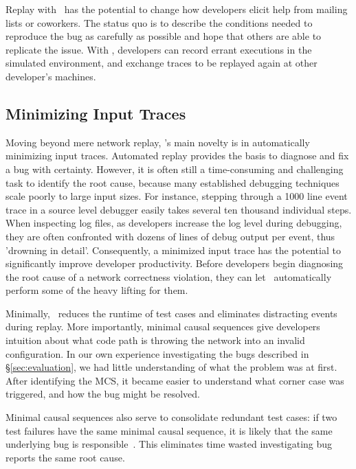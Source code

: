 Replay with \projectname~has the potential to change how developers elicit help from
mailing lists or coworkers. The status quo is to describe the conditions needed to
reproduce the bug as carefully as possible and hope that others are able
to replicate the issue. With \projectname, developers can record errant executions in the simulated
environment, and exchange traces to be replayed again at other
developer's machines.

\subsection{Minimizing Input Traces}

Moving beyond mere network replay, \projectname's main novelty is in
automatically minimizing input traces. Automated replay provides the basis to
diagnose and fix a bug with certainty. However, it is often still a
time-consuming and challenging task to identify the root cause, because many
established debugging techniques scale poorly to large input sizes. For
instance, stepping through a 1000 line event trace in a source level debugger
easily takes several ten thousand individual steps. When inspecting log files,
as developers increase the log level during debugging, they are often confronted
with dozens of lines of debug output per event, thus 'drowning in detail'.
Consequently, a minimized input trace has the potential to significantly improve
developer productivity. Before developers begin diagnosing the root cause of a
network correctness violation, they can let \simulator~automatically perform
some of the heavy lifting for them.

Minimally, \simulator~reduces the runtime of test cases and eliminates
distracting events during replay. More importantly, minimal causal sequences
give developers intuition about what code path is throwing
the network into an invalid configuration. In our own experience
investigating the bugs described in \S\ref{sec:evaluation}, we had little
understanding of what the problem was at first. After identifying the MCS, it
became easier to understand what corner case was triggered, and how the
bug might be resolved.

Minimal causal sequences also serve to consolidate redundant test cases:
if two test failures have the same minimal causal sequence, it is
likely that the same underlying bug is
responsible~\cite{Zeller:2002:SIF:506201.506206}.
This eliminates time wasted
investigating bug reports the same root cause.

